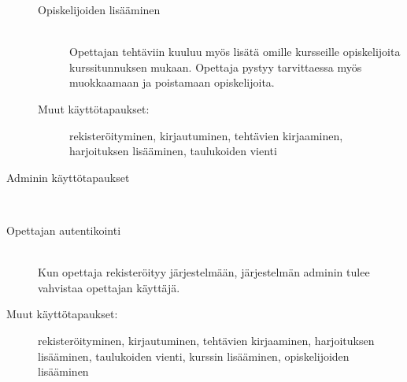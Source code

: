 \documentclass[a4paper,12pt, titlepage]{article}
\begin{document}
\begin{description}
\begin{description}
		\item[Opiskelijoiden lisääminen] \hfill \\
		Opettajan tehtäviin kuuluu myös lisätä omille kursseille opiskelijoita
		kurssitunnuksen mukaan. Opettaja pystyy tarvittaessa myös muokkaamaan
		ja poistamaan opiskelijoita.
		\item[Muut käyttötapaukset:] rekisteröityminen, kirjautuminen,
		tehtävien kirjaaminen, harjoituksen lisääminen, taulukoiden vienti
	\end{description}
	\item[Adminin käyttötapaukset] \hfill \\
		\item[Opettajan autentikointi] \hfill \\
		Kun opettaja rekisteröityy järjestelmään, järjestelmän adminin
		tulee vahvistaa opettajan käyttäjä.
		\item[Muut käyttötapaukset:] rekisteröityminen, kirjautuminen,
		tehtävien kirjaaminen, harjoituksen lisääminen, taulukoiden vienti,
		kurssin lisääminen, opiskelijoiden lisääminen
\end{description}
\end{document}
